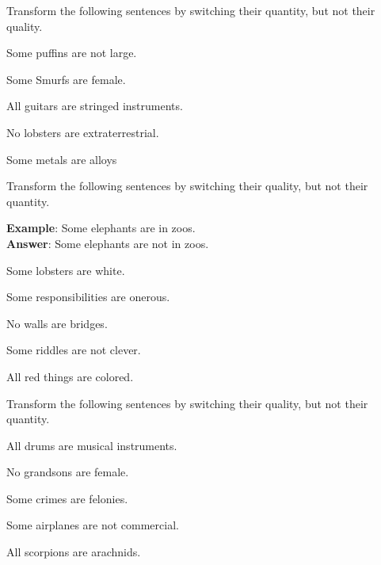 \noindent\problempart Transform the following sentences by switching their quantity, but not their quality.

\begin{exercises}
\item Some puffins are not large. 
\item Some Smurfs are female.
\item All guitars are stringed instruments. 
\item No lobsters are extraterrestrial.
\item Some metals are alloys 
\end{exercises}

\noindent\problempart Transform the following sentences by switching their quality, but not their quantity.

\textbf{Example}: Some elephants are in zoos. \\
\textbf{Answer}: Some elephants are not in zoos. 

\begin{exercises}
\item Some lobsters are white. 

\item Some responsibilities are onerous. 

\item No walls are bridges. 

\item Some riddles are not clever.
 
\item All red things are colored. 
\end{exercises}

\noindent\problempart Transform the following sentences by switching their quality, but not their quantity.

\begin{exercises}
\item All drums are musical instruments. 
\item No grandsons are female. 
\item Some crimes are felonies.
\item Some airplanes are not commercial. 
\item All scorpions are arachnids. 
\end{exercises}

